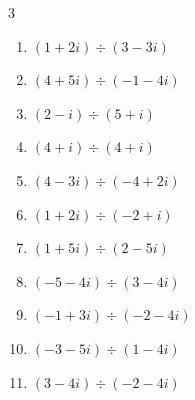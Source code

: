 


\setcounter{quesnum}{30}

\begin{multicols}{3}
\begin{enumerate}
  \itemsep=30pt
  \item $\displaystyle (1+2i)\div(3-3i)$


  \item $\displaystyle (4+5i)\div(-1-4i)$


  \item $\displaystyle (2-i)\div(5+i)$


  \item $\displaystyle (4+i)\div(4+i)$

        \phantom{$\displaystyle =1$}

  \item $\displaystyle (4-3i)\div(-4+2i)$


  \item $\displaystyle (1+2i)\div(-2+i)$

        \phantom{$\displaystyle =-i$}

  \item $\displaystyle (1+5i)\div(2-5i)$


  \item $\displaystyle (-5-4i)\div(3-4i)$


  \item $\displaystyle (-1+3i)\div(-2-4i)$


  \item $\displaystyle (-3-5i)\div(1-4i)$

        \phantom{$\displaystyle =1-i$}

\columnbreak %

  \item $\displaystyle (3-4i)\div(-2-4i)$


\end{enumerate}
\end{multicols}
